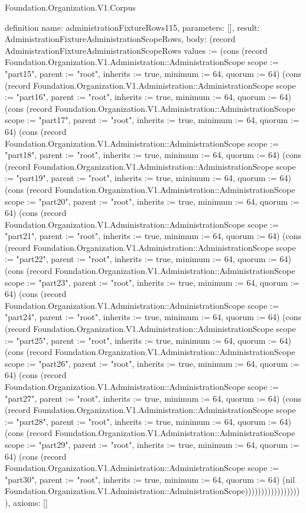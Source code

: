 \begin{lexlean}{Foundation.Organization.V1.Corpus}
\begin{semanticmodule}
definition{
  name: administrationFixtureRows115,
  parameters: [],
  result: AdministrationFixtureAdministrationScopeRows,
  body: (record AdministrationFixtureAdministrationScopeRows {values := (cons (record Foundation.Organization.V1.Administration::AdministrationScope {scope := "part15", parent := "root", inherits := true, minimum := 64, quorum := 64}) (cons (record Foundation.Organization.V1.Administration::AdministrationScope {scope := "part16", parent := "root", inherits := true, minimum := 64, quorum := 64}) (cons (record Foundation.Organization.V1.Administration::AdministrationScope {scope := "part17", parent := "root", inherits := true, minimum := 64, quorum := 64}) (cons (record Foundation.Organization.V1.Administration::AdministrationScope {scope := "part18", parent := "root", inherits := true, minimum := 64, quorum := 64}) (cons (record Foundation.Organization.V1.Administration::AdministrationScope {scope := "part19", parent := "root", inherits := true, minimum := 64, quorum := 64}) (cons (record Foundation.Organization.V1.Administration::AdministrationScope {scope := "part20", parent := "root", inherits := true, minimum := 64, quorum := 64}) (cons (record Foundation.Organization.V1.Administration::AdministrationScope {scope := "part21", parent := "root", inherits := true, minimum := 64, quorum := 64}) (cons (record Foundation.Organization.V1.Administration::AdministrationScope {scope := "part22", parent := "root", inherits := true, minimum := 64, quorum := 64}) (cons (record Foundation.Organization.V1.Administration::AdministrationScope {scope := "part23", parent := "root", inherits := true, minimum := 64, quorum := 64}) (cons (record Foundation.Organization.V1.Administration::AdministrationScope {scope := "part24", parent := "root", inherits := true, minimum := 64, quorum := 64}) (cons (record Foundation.Organization.V1.Administration::AdministrationScope {scope := "part25", parent := "root", inherits := true, minimum := 64, quorum := 64}) (cons (record Foundation.Organization.V1.Administration::AdministrationScope {scope := "part26", parent := "root", inherits := true, minimum := 64, quorum := 64}) (cons (record Foundation.Organization.V1.Administration::AdministrationScope {scope := "part27", parent := "root", inherits := true, minimum := 64, quorum := 64}) (cons (record Foundation.Organization.V1.Administration::AdministrationScope {scope := "part28", parent := "root", inherits := true, minimum := 64, quorum := 64}) (cons (record Foundation.Organization.V1.Administration::AdministrationScope {scope := "part29", parent := "root", inherits := true, minimum := 64, quorum := 64}) (cons (record Foundation.Organization.V1.Administration::AdministrationScope {scope := "part30", parent := "root", inherits := true, minimum := 64, quorum := 64}) (nil Foundation.Organization.V1.Administration::AdministrationScope)))))))))))))))))}),
  axioms: []
}


\end{semanticmodule}
\end{lexlean}
